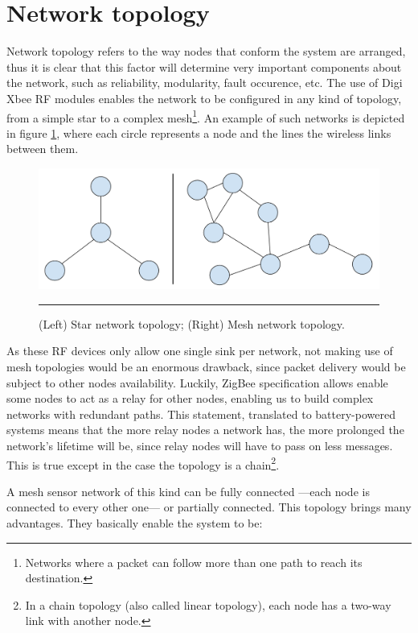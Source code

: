 \section{Network topology}

Network topology refers to the way nodes that conform the system are arranged, thus it is clear that this factor will determine very important components about the network, such as reliability, modularity, fault occurence, etc. The use of Digi Xbee\textregistered{} RF modules enables the network to be configured in any kind of topology, from a simple star to a complex mesh\footnote{Networks where a packet can follow more than one path to reach its destination.}. An example of such networks is depicted in figure \ref{fig:MeshNet}, where each circle represents a node and the lines the wireless links between them.

\begin{figure}[htbp]
    \centering
        \includegraphics[scale=0.29]{./Figures/mesh_network.png}
        \rule{35em}{0.5pt}
        \caption[Mesh Network]{(Left) Star network topology; (Right) Mesh network topology.}
    \label{fig:MeshNet}
\end{figure}

As these RF devices only allow one single sink per network, not making use of mesh topologies would be an enormous drawback, since packet delivery would be subject to other nodes availability. Luckily, ZigBee specification allows enable some nodes to act as a relay for other nodes, enabling us to build complex networks with redundant paths. This statement, translated to battery-powered systems means that the more relay nodes a network has, the more prolonged the network's lifetime will be\cite{hou2005energy}, since relay nodes will have to pass on less messages. This is true except in the case the topology is a chain\footnote{In a chain topology (also called linear topology), each node has a two-way link with another node.}.


A mesh sensor network of this kind can be fully connected ---each node is connected to every other one--- or partially connected. This topology brings many advantages. They basically enable the system to be:

